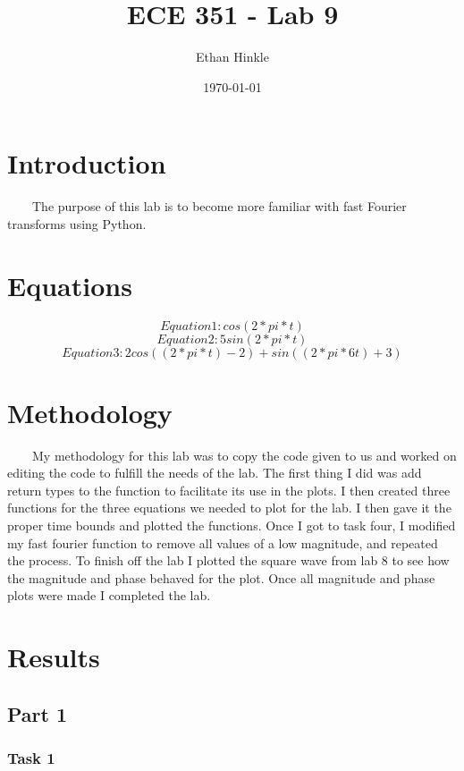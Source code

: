 \documentclass[11pt,a4]{article}
\title{ECE 351 - Lab 9}
\author{Ethan Hinkle}
\date{\today}
\begin{document}
\maketitle

\section{Introduction}

\ \ \ \ The purpose of this lab is to become more familiar with fast Fourier transforms using Python.

\section{Equations}

$$Equation 1: cos(2*pi*t)$$
$$Equation 2: 5sin(2*pi*t)$$
$$Equation 3: 2cos((2*pi*t)-2) + sin((2*pi*6t)+3)$$

\section{Methodology}

\ \ \ \ My methodology for this lab was to copy the code given to us and worked on editing the code to fulfill the needs of the lab. The first thing I did was add return types to the function to facilitate its use in the plots. I then created three functions for the three equations we needed to plot for the lab. I then gave it the proper time bounds and plotted the functions. Once I got to task four, I modified my fast fourier function to remove all values of a low magnitude, and repeated the process. To finish off the lab I plotted the square wave from lab 8 to see how the magnitude and phase behaved for the plot. Once all magnitude and phase plots were made I completed the lab.
\section{Results}

\subsection{Part 1}

\subsubsection{Task 1}
\end{document}
